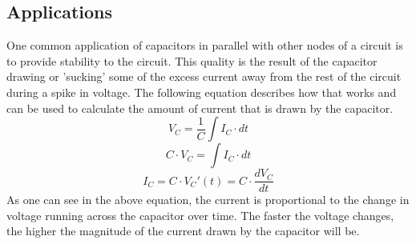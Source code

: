 \documentclass{article}
\begin{document}
	\subsection{Applications}
	One common application of capacitors in parallel with other nodes of a 
	circuit is to provide stability to the circuit.  This quality is the result 
	of the 
	capacitor drawing or 'sucking' some of the excess current away from the 
	rest of the circuit during a spike in voltage.  The following equation 
	describes how that works and can be used to calculate the amount of current 
	that is drawn by the capacitor.
	$$ V_C = \frac{1}{C} \int I_C \cdot dt$$
	$$ C \cdot V_C = \int I_C \cdot dt$$
	$$ I_C = C \cdot V_C'(t) = C \cdot \frac{dV_C}{dt}$$
	As one can see in the above equation, the current is proportional to the 
	change in voltage running across the capacitor over time.  The faster the 
	voltage changes, the higher the magnitude of the current drawn by the 
	capacitor will be.
\end{document}
